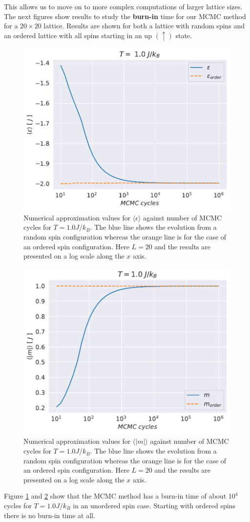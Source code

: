 \documentclass[english,notitlepage,reprint,nofootinbib]{revtex4-1}  %
\begin{document}
This allows us to move on to more complex computations of larger lattice sizes. The next figures show results to study the \textbf{burn-in} time for our MCMC method for a $20 \times 20$ lattice. Results are shown for both a lattice with random spins and an ordered lattice with all spins starting in an up $(\uparrow)$ state.
\begin{figure}[H]
    \centering
    \includegraphics[width=.5\textwidth]{../figures/numeric_L_20_T_1_e.pdf}
    \caption{Numerical approximation values for $\langle \epsilon \rangle$ against number of MCMC cycles for $T=1.0 J/k_B$. The blue line shows the evolution from a random spin configuration whereas the orange line is for the case of an ordered spin configuration. Here $L=20$ and the results are presented on a log scale along the $x$ axis.}
    \label{fig:numeric_L_20_T_1_e}
\end{figure}
\begin{figure}[H]
    \centering
    \includegraphics[width=.5\textwidth]{../figures/numeric_L_20_T_1_m.pdf}
    \caption{Numerical approximation values for $\langle |m| \rangle$ against number of MCMC cycles for $T=1.0 J/k_B$. The blue line shows the evolution from a random spin configuration whereas the orange line is for the case of an ordered spin configuration. Here $L=20$ and the results are presented on a log scale along the $x$ axis.}
    \label{fig:numeric_L_20_T_1_m}
\end{figure}
Figure \ref{fig:numeric_L_20_T_1_e} and \ref{fig:numeric_L_20_T_1_m} show that the MCMC method has a burn-in time of about $10^4$ cycles for $T=1.0J/k_B$ in an unordered spin case. Starting with ordered spins there is no burn-in time at all.
\end{document}
